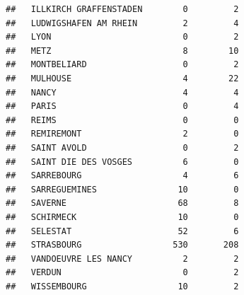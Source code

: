 \documentclass{article}\usepackage[]{graphicx}\usepackage[]{color}
\makeatletter
\newenvironment{kframe}{%
 \def\at@end@of@kframe{}%
 \ifinner\ifhmode%
  \def\at@end@of@kframe{\end{minipage}}%
  \begin{minipage}{\columnwidth}%
 \fi\fi%
 \def\FrameCommand##1{\hskip\@totalleftmargin \hskip-\fboxsep
 \colorbox{shadecolor}{##1}\hskip-\fboxsep
     \hskip-\linewidth \hskip-\@totalleftmargin \hskip\columnwidth}%
 \MakeFramed {\advance\hsize-\width
   \@totalleftmargin\z@ \linewidth\hsize
   \@setminipage}}%
 {\par\unskip\endMakeFramed%
 \at@end@of@kframe}
\newenvironment{knitrout}{}{} %
\makeatother
\begin{document}
\begin{knitrout}
\begin{kframe}
\begin{verbatim}
##   ILLKIRCH GRAFFENSTADEN        0         2
##   LUDWIGSHAFEN AM RHEIN         2         4
##   LYON                          0         2
##   METZ                          8        10
##   MONTBELIARD                   0         2
##   MULHOUSE                      4        22
##   NANCY                         4         4
##   PARIS                         0         4
##   REIMS                         0         0
##   REMIREMONT                    2         0
##   SAINT AVOLD                   0         2
##   SAINT DIE DES VOSGES          6         0
##   SARREBOURG                    4         6
##   SARREGUEMINES                10         0
##   SAVERNE                      68         8
##   SCHIRMECK                    10         0
##   SELESTAT                     52         6
##   STRASBOURG                  530       208
##   VANDOEUVRE LES NANCY          2         2
##   VERDUN                        0         2
##   WISSEMBOURG                  10         2
\end{verbatim}
\end{kframe}
\end{knitrout}
\end{document}
